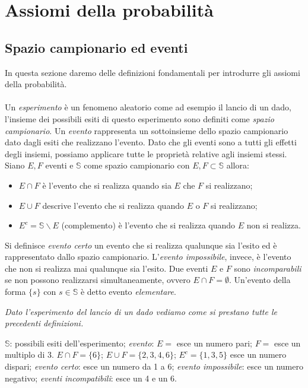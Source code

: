 \chapter{Assiomi della probabilità}

\section{Spazio campionario ed eventi}
In questa sezione daremo delle definizioni fondamentali per introdurre gli assiomi della probabilità.\\\\
Un \textit{esperimento} è un fenomeno aleatorio come ad esempio il lancio di un dado, l'insieme dei possibili esiti di questo esperimento sono definiti come \textit{spazio campionario}. Un \textit{evento} rappresenta un sottoinsieme dello spazio campionario dato dagli esiti che realizzano l'evento. Dato che gli eventi sono a tutti gli effetti degli insiemi, possiamo applicare tutte le proprietà relative agli insiemi stessi. Siano $E, F$ eventi e $\mathbb{S}$ come spazio campionario con $E, F\subset\mathbb{S}$ allora:
\begin{itemize}
    \item $E\cap F$ è l'evento che si realizza quando sia $E$ che $F$ si realizzano;
    \item $E\cup F$ descrive l'evento che si realizza quando $E$ o $F$ si realizzano;
    \item $E^c=\mathbb{S}\backslash E$ (complemento) è l'evento che si realizza quando $E$ non si realizza.
\end{itemize}

Si definisce \textit{evento certo} un evento che si realizza qualunque sia l'esito ed è rappresentato dallo spazio campionario. L'\textit{evento impossibile}, invece, è l'evento che non si realizza mai qualunque sia l'esito. Due eventi $E$ e $F$ sono \textit{incomparabili} se non possono realizzarsi simultaneamente, ovvero $E\cap F=\emptyset$. Un'evento della forma $\{s\}$ con $s\in\mathbb{S}$ è detto evento \textit{elementare}.

\begin{Example}{}{}
    \textit{Dato l'esperimento del lancio di un dado vediamo come si prestano tutte le precedenti definizioni.}
    
    $\mathbb{S}$: possibili esiti dell'esperimento; \textit{evento}: $E =$ esce un numero pari; $F =$ esce un multiplo di 3. $E\cap F=\{6\}$; $E\cup F=\{2,3,4,6\}$; $E^c=\{1,3,5\}$ esce un numero dispari; \textit{evento certo}: esce un numero da 1 a 6; \textit{evento impossibile}: esce un numero negativo; \textit{eventi incompatibili}: esce un 4 e un 6.
\end{Example}

